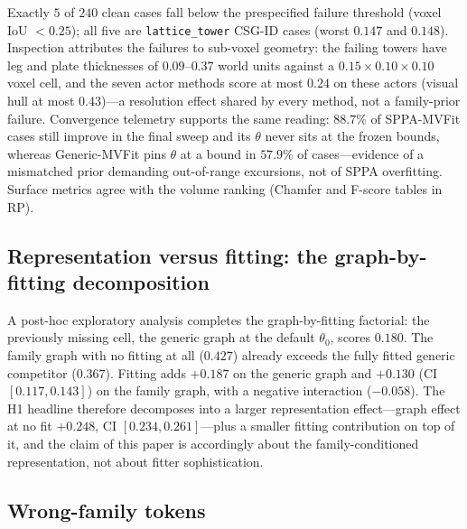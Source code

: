 \documentclass[11pt,a4paper]{article}
\begin{document}
Exactly \(5\) of \(240\) clean cases fall below the prespecified failure
threshold (voxel IoU \(<0.25\)); all five are \texttt{lattice\_tower} CSG-ID
cases (worst \(0.147\) and \(0.148\)). Inspection attributes the failures to
sub-voxel geometry: the failing towers have leg and plate thicknesses of
\(0.09\)--\(0.37\) world units against a \(0.15\times0.10\times0.10\) voxel
cell, and the seven actor methods score at most \(0.24\) on these actors
(visual hull at most \(0.43\))---a resolution effect shared by every method,
not a family-prior failure. Convergence telemetry supports the same reading:
\(88.7\%\) of SPPA-MVFit cases still improve in the final sweep and its
\(\theta\) never sits at the frozen bounds, whereas Generic-MVFit pins
\(\theta\) at a bound in \(57.9\%\) of cases---evidence of a mismatched prior
demanding out-of-range excursions, not of SPPA overfitting. Surface metrics
agree with the volume ranking (Chamfer and F-score tables in RP).

\subsection{Representation versus fitting: the graph-by-fitting decomposition}
\label{sec:results-decomposition}

A post-hoc exploratory analysis completes the graph-by-fitting factorial:
the previously missing cell, the generic
graph at the default \(\theta_0\), scores \(0.180\). The family graph with no
fitting at all (\(0.427\)) already exceeds the fully fitted generic
competitor (\(0.367\)). Fitting adds \(+0.187\) on the generic graph and
\(+0.130\) (CI \([0.117,0.143]\)) on the family graph, with a negative
interaction (\(-0.058\)). The H1 headline therefore decomposes into a larger
representation effect---graph effect at no fit \(+0.248\), CI
\([0.234,0.261]\)---plus a smaller fitting contribution on top of it, and the
claim of this paper is accordingly about the family-conditioned
representation, not about fitter sophistication.

\subsection{Wrong-family tokens}
\label{sec:wrong-family}
\end{document}
